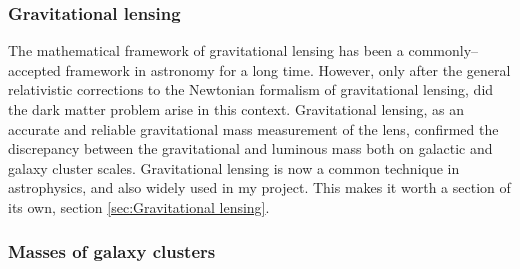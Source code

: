 \documentclass[paper=a4, fontsize=11pt]{scrartcl} %
\numberwithin{equation}{section} %
\numberwithin{figure}{section} %
\numberwithin{table}{section} %
\begin{document}
\subsubsection{Gravitational lensing}

The mathematical framework of gravitational lensing has been a commonly--accepted framework in astronomy for a long time. However, only after the general relativistic corrections to the Newtonian formalism of gravitational lensing, did the dark matter problem arise in this context. Gravitational lensing, as an accurate and reliable gravitational mass measurement of the lens, confirmed the discrepancy between the gravitational and luminous mass both on galactic and galaxy cluster scales. Gravitational lensing is now a common technique in astrophysics, and also widely used in my project. This makes it worth a section of its own, section \ref{sec:Gravitational lensing}.

\subsubsection{Masses of galaxy clusters}

\end{document}
